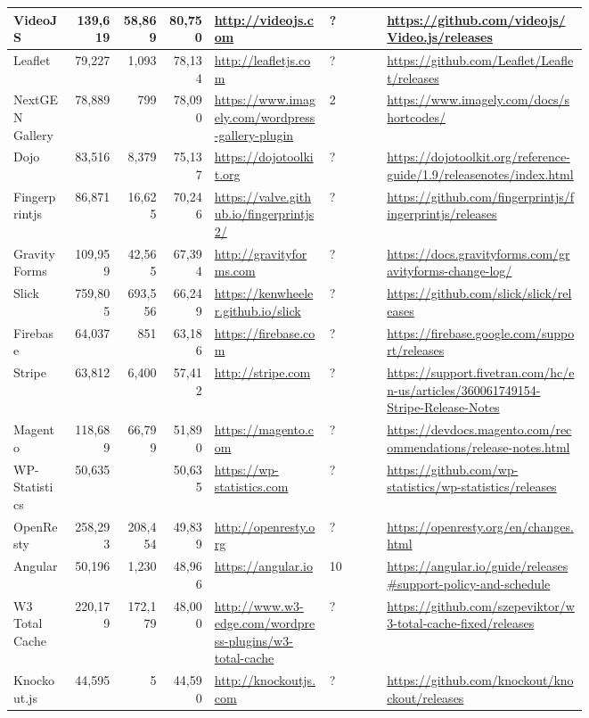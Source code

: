 \begin{landscape}
\begin{longtable}{|p{0.1\linewidth}|r|r|r|p{0.2\linewidth}|p{0.1\linewidth}|p{0.35\linewidth}|}
		VideoJS &139,619 &58,869 &80,750 &\url{http://videojs.com} &? &\url{https://github.com/videojs/Video.js/releases} \\\hline
		Leaflet &79,227 &1,093 &78,134 &\url{http://leafletjs.com} &? &\url{https://github.com/Leaflet/Leaflet/releases} \\\hline
		NextGEN Gallery &78,889 &799 &78,090 &\url{https://www.imagely.com/wordpress-gallery-plugin} &2 &\url{https://www.imagely.com/docs/shortcodes/} \\\hline
		Dojo &83,516 &8,379 &75,137 &\url{https://dojotoolkit.org} &? &\url{https://dojotoolkit.org/reference-guide/1.9/releasenotes/index.html} \\\hline
		Fingerprintjs &86,871 &16,625 &70,246 &\url{https://valve.github.io/fingerprintjs2/} &? &\url{https://github.com/fingerprintjs/fingerprintjs/releases} \\\hline
		Gravity Forms &109,959 &42,565 &67,394 &\url{http://gravityforms.com} &? &\url{https://docs.gravityforms.com/gravityforms-change-log/} \\\hline
		Slick &759,805 &693,556 &66,249 &\url{https://kenwheeler.github.io/slick} &? &\url{https://github.com/slick/slick/releases} \\\hline
		Firebase &64,037 &851 &63,186 &\url{https://firebase.com} &? &\url{https://firebase.google.com/support/releases} \\\hline
		Stripe &63,812 &6,400 &57,412 &\url{http://stripe.com} &? &\url{https://support.fivetran.com/hc/en-us/articles/360061749154-Stripe-Release-Notes} \\\hline
		Magento &118,689 &66,799 &51,890 &\url{https://magento.com} &? &\url{https://devdocs.magento.com/recommendations/release-notes.html} \\\hline
		WP-Statistics &50,635 & &50,635 &\url{https://wp-statistics.com} &? &\url{https://github.com/wp-statistics/wp-statistics/releases} \\\hline
		OpenResty &258,293 &208,454 &49,839 &\url{http://openresty.org} &? &\url{https://openresty.org/en/changes.html} \\\hline
		Angular &50,196 &1,230 &48,966 &\url{https://angular.io} &10 &\url{https://angular.io/guide/releases\#support-policy-and-schedule}\\\hline
		W3 Total Cache &220,179 &172,179 &48,000 &\url{http://www.w3-edge.com/wordpress-plugins/w3-total-cache} &? &\url{https://github.com/szepeviktor/w3-total-cache-fixed/releases} \\\hline
		Knockout.js &44,595 &5 &44,590 &\url{http://knockoutjs.com} &? &\url{https://github.com/knockout/knockout/releases} \\\hline

\end{longtable}
\end{landscape}
